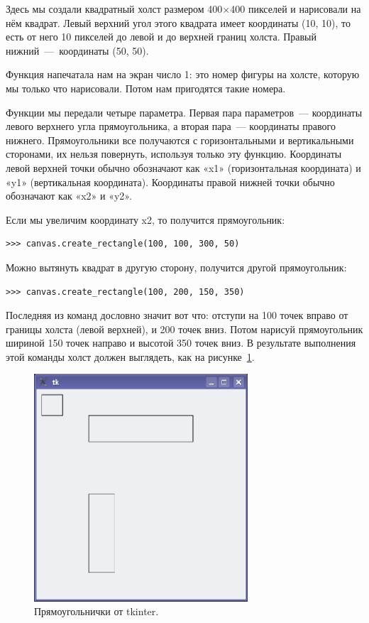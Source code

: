 Здесь мы создали квадратный холст размером 400×400 пикселей и нарисовали на нём квадрат. Левый верхний угол этого квадрата имеет координаты (10, 10), то есть от него 10 пикселей до левой и до верхней границ холста. Правый нижний — координаты (50, 50).

Функция  напечатала нам на экран число 1: это номер фигуры на холсте, которую мы только что нарисовали. Потом нам пригодятся такие номера.

Функции  мы передали четыре параметра. Первая пара параметров — координаты левого верхнего угла прямоугольника, а вторая пара — координаты правого нижнего. Прямоугольники все получаются с горизонтальными и вертикальными сторонами, их нельзя повернуть, используя только эту функцию. Координаты левой верхней точки обычно обозначают как «x1» (горизонтальная координата) и «y1» (вертикальная координата). Координаты правой нижней точки обычно обозначают как «x2» и «y2».

Если мы увеличим координату x2, то получится прямоугольник:

\begin{listing}
\begin{verbatim}
>>> canvas.create_rectangle(100, 100, 300, 50)
\end{verbatim}
\end{listing}

Можно вытянуть квадрат в другую сторону, получится другой прямоугольник:

\begin{listing}
\begin{verbatim}
>>> canvas.create_rectangle(100, 200, 150, 350)
\end{verbatim}
\end{listing}

Последняя из команд дословно значит вот что: отступи на 100 точек вправо от границы холста (левой верхней), и 200 точек вниз. Потом нарисуй прямоугольник шириной 150 точек направо и высотой 350 точек вниз. В результате выполнения этой команды холст должен выглядеть, как на рисунке \ref{fig33}.

\begin{figure}
\begin{center}
\includegraphics[width=80mm]{../en/figure33.eps}
\end{center}
\caption{Прямоугольнички от tkinter.}\label{fig33}
\end{figure}


